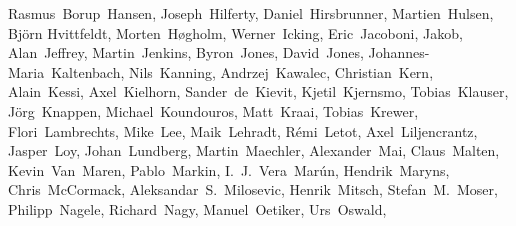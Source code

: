 \begin{flushleft}
Rasmus~Borup~Hansen,    %
Joseph~Hilferty,        %
Daniel~Hirsbrunner,     %
Martien~Hulsen,         %
Bj\"orn Hvittfeldt,     %
Morten~H\o gholm,       %
Werner~Icking,          %
Eric~Jacoboni,          %
Jakob,                  %
Alan~Jeffrey,           %
Martin~Jenkins,         %
Byron~Jones,            %
David~Jones,            %
Johannes-Maria~Kaltenbach, %
Nils~Kanning,           %
Andrzej~Kawalec,        %
Christian~Kern,         %
Alain~Kessi,            %
Axel~Kielhorn,          %
Sander~de~Kievit,       %
Kjetil~Kjernsmo,        %
Tobias~Klauser,		%
J\"org~Knappen,         %
Michael~Koundouros,     %
Matt~Kraai,             %
Tobias~Krewer,          %
Flori~Lambrechts,       %
Mike~Lee,               %
Maik~Lehradt,           %
R\'emi~Letot,           %
Axel~Liljencrantz,	%
Jasper~Loy,             %
Johan~Lundberg,         %
Martin~Maechler,        %
Alexander~Mai,          %
Claus~Malten,           %
Kevin~Van~Maren,        %
Pablo~Markin,
I.~J.~Vera~Mar\'un,     %
Hendrik~Maryns,         %
Chris~McCormack,        %
Aleksandar~S.~Milosevic, %
Henrik~Mitsch,          %
Stefan~M.~Moser,        %
Philipp~Nagele,         %
Richard~Nagy,           %
Manuel~Oetiker,         %
Urs~Oswald,             %

\end{flushleft}
